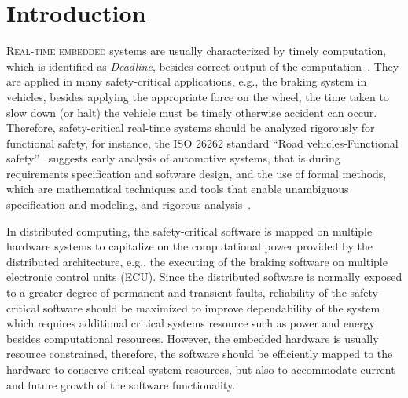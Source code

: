 \chapter{Introduction}\label{chapter_introduction}
\lettrine{R}{eal-time embedded} systems are usually characterized by timely computation, which is identified as \textit{Deadline}, besides correct output of the computation~\cite{Buttazzo2003HardApplications}. They are applied in many safety-critical applications, e.g., the braking system in vehicles, besides applying the appropriate force on the wheel, the time taken to slow down (or halt) the vehicle must be timely otherwise accident can occur. Therefore, safety-critical real-time systems should be analyzed rigorously for functional safety, for instance, the ISO 26262 standard ``Road vehicles-Functional safety''~\cite{iso201126262} suggests early analysis of automotive systems, that is during requirements specification and software design, and the use of formal methods, which are mathematical techniques and tools that enable unambiguous specification and modeling, and rigorous analysis~\cite{o2017concise}.

In distributed computing, the safety-critical software is mapped on multiple hardware systems to capitalize on the computational power provided by the distributed architecture, e.g., the executing of the braking software on multiple electronic control units (ECU). Since the distributed software is  normally exposed to a greater degree of permanent and transient faults, reliability of the safety-critical software should be maximized to improve dependability of the  system which requires additional critical systems resource such as power and energy besides computational resources. However, the embedded hardware is usually resource constrained, therefore, the software should be efficiently mapped to the hardware to conserve critical system resources, but also to accommodate current and future growth of the software functionality.

